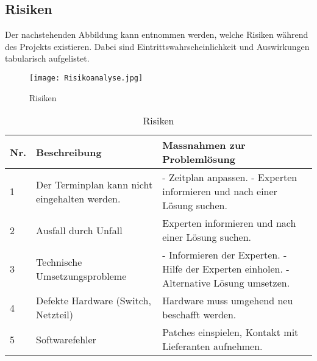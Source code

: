 \newpage
\subsection{Risiken}
Der nachstehenden Abbildung kann entnommen werden, welche Risiken während des Projekts existieren. Dabei sind  Eintrittswahrscheinlichkeit und Auswirkungen tabularisch aufgelistet.
\begin{figure}[htb]
\centering
\texttt{[image: Risikoanalyse.jpg]}
\caption{Risiken}
\label{fig:Risk}
\end{figure} 

\begin{table}[H]
\centering
\begin{tabular}{p{1cm}p{6cm}p{9cm}}
\hline
\rowcolor{heading} \textbf{Nr.} & \textbf{Beschreibung} & \textbf{Massnahmen zur Problemlösung} \\\hline
1 & Der Terminplan kann nicht eingehalten werden. & - Zeitplan anpassen. \newline - Experten informieren und nach einer Lösung suchen. \\\hline
2 & Ausfall durch Unfall & Experten informieren und nach einer Lösung suchen.  \\\hline
3 & Technische Umsetzungsprobleme & - Informieren der Experten. \newline - Hilfe der Experten einholen. \newline - Alternative Lösung umsetzen. \\\hline
4 & Defekte Hardware (Switch, Netzteil) & Hardware muss umgehend neu beschafft werden.  \\\hline
5 & Softwarefehler & Patches einspielen, Kontakt mit Lieferanten aufnehmen.  \\\hline
\end{tabular}
\caption{Risiken}
\end{table}


